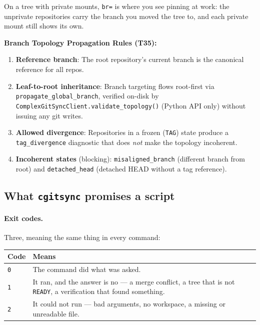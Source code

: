 On a tree with private mounts, \texttt{br=} is where you see pinning at work:
the unprivate repositories carry the branch you moved the tree to, and each
private mount still shows its own.

\textbf{Branch Topology Propagation Rules (T35):}

\begin{enumerate}
  \item \textbf{Reference branch}: The root repository's current branch is
        the canonical reference for all repos.
  \item \textbf{Leaf-to-root inheritance}: Branch targeting flows
        root-first via \texttt{propagate\_global\_branch}, verified
        on-disk by \texttt{ComplexGitSyncClient.validate\_topology()}
        (Python API only) without issuing any git writes.
  \item \textbf{Allowed divergence}: Repositories in a frozen
        (\texttt{TAG}) state produce a \texttt{tag\_divergence} diagnostic
        that does \emph{not} make the topology incoherent.
  \item \textbf{Incoherent states} (blocking): \texttt{misaligned\_branch}
        (different branch from root) and \texttt{detached\_head} (detached
        HEAD without a tag reference).
\end{enumerate}

\subsection{What \texttt{cgitsync} promises a script}

\paragraph{Exit codes.} Three, meaning the same thing in every command:

\begin{center}
\begin{tabular}{lp{10.5cm}}
\textbf{Code} & \textbf{Means} \\
\hline
\texttt{0} & The command did what was asked. \\
\texttt{1} & It ran, and the answer is no --- a merge conflict, a tree that
             is not \texttt{READY}, a verification that found something. \\
\texttt{2} & It could not run --- bad arguments, no workspace, a missing or
             unreadable file. \\
\end{tabular}
\end{center}

